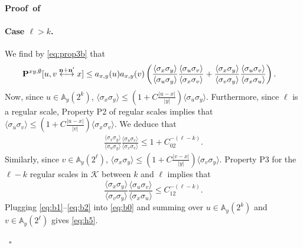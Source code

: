 \documentclass[a4paper,oneside,11pt]{article}
\numberwithin{equation}{section}
\numberwithin{equation}{section}
\numberwithin{equation}{section}
\newenvironment{proof}[1][\relax]%
  {\paragraph{Proof\ifx#1\relax\else~of #1\fi}}%
  {~\hfill$\square$\par\bigskip}
\newcommand{\calK}{\mathcal{K}}
\newcommand{\bbA}{\mathbb{A}}
\newcommand{\n}{\mathbf{n}}
\begin{document}
\begin{proof}
\paragraph{Case $\ell>k$.} We find by \eqref{eq:prop3b} that 
\begin{align}\label{eq:b0}{\bf P}^{xy,\emptyset}[u,v\stackrel{\n+\n'}\longleftrightarrow x]&\le a_{x,y}(u)a_{x,y}(v)\left(\frac{\langle\sigma_x\sigma_y\rangle}{\langle\sigma_u\sigma_y\rangle}\frac{\langle\sigma_u\sigma_v\rangle}{\langle\sigma_x\sigma_v\rangle}+\frac{\langle\sigma_x\sigma_y\rangle}{\langle\sigma_v\sigma_y\rangle}\frac{\langle\sigma_u\sigma_v\rangle}{\langle\sigma_x\sigma_u\rangle}\right).\end{align}
Now, since $u\in \bbA_{y}(2^k)$, $\langle\sigma_x\sigma_y\rangle\le(1+C\tfrac{|u-x|}{|y|})\langle\sigma_u\sigma_y\rangle$.  Furthermore, since $\ell$ is a regular scale, Property P2 of regular scales  implies that $\langle\sigma_u\sigma_v\rangle\le (1+C\tfrac{|u-x|}{|v|})\langle\sigma_x\sigma_v\rangle$. We deduce that 
\begin{align}\label{eq:b1}\frac{\langle\sigma_x\sigma_y\rangle}{\langle\sigma_u\sigma_y\rangle}\frac{\langle\sigma_u\sigma_v\rangle}{\langle\sigma_x\sigma_v\rangle}\le 1+C_02^{-(\ell-k)}.\end{align}
Similarly,  since $v\in \bbA_{y}(2^\ell)$, $\langle\sigma_x\sigma_y\rangle\le(1+C\tfrac{|v-x|}{|y|})\langle\sigma_v\sigma_y\rangle$.  Property P3 for the $\ell-k$ regular scales in $\calK$ between $k$ and $\ell$ implies that 
\begin{equation}\label{eq:b2}\frac{\langle\sigma_x\sigma_y\rangle}{\langle\sigma_v\sigma_y\rangle}\frac{\langle\sigma_u\sigma_v\rangle}{\langle\sigma_x\sigma_u\rangle}\le C_12^{-(\ell-k)}.\end{equation}
Plugging \eqref{eq:b1}--\eqref{eq:b2}  into \eqref{eq:b0} and summing over $u\in\bbA_{y}(2^k)$ and $v\in\bbA_{y}(2^\ell)$ gives \eqref{eq:h5}.


\end{proof}
\end{document}
